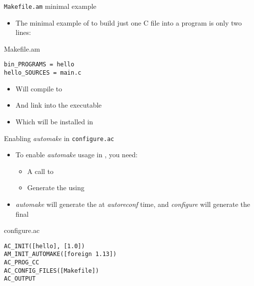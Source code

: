 \begin{frame}[fragile]{{\tt Makefile.am} minimal example}

  \begin{itemize}
  \item The minimal example of  to build just one C
    file into a program is only two lines:
  \end{itemize}

  \begin{block}{Makefile.am}
\begin{verbatim}
bin_PROGRAMS = hello
hello_SOURCES = main.c
\end{verbatim}
  \end{block}

  \begin{itemize}
  \item Will compile  to 
  \item And link  into the  executable
  \item Which will be installed in 
  \end{itemize}
\end{frame}

\begin{frame}[fragile]{Enabling {\em automake} in {\tt configure.ac}}
  \begin{itemize}
  \item To enable {\em automake} usage in , you
    need:
    \begin{itemize}
    \item A call to 
    \item Generate the  using 
    \end{itemize}
  \item {\em automake} will generate the  at {\em
      autoreconf} time, and {\em configure} will generate the final
  \end{itemize}

  \begin{block}{configure.ac}
\begin{verbatim}
AC_INIT([hello], [1.0])
AM_INIT_AUTOMAKE([foreign 1.13])
AC_PROG_CC
AC_CONFIG_FILES([Makefile])
AC_OUTPUT
\end{verbatim}
  \end{block}

\end{frame}

